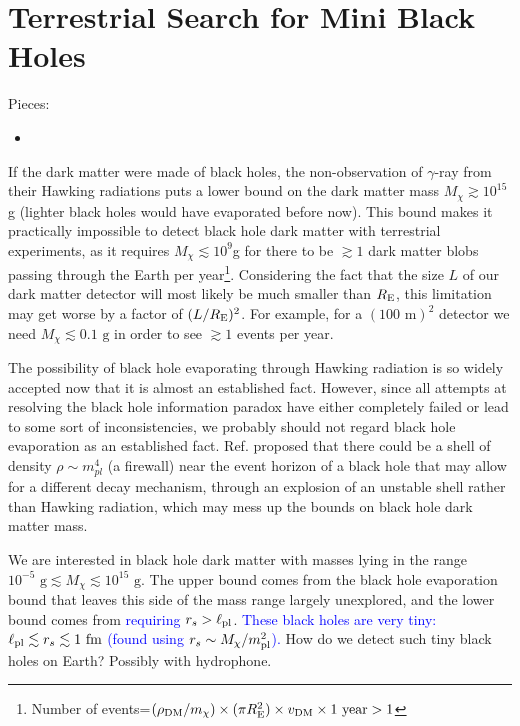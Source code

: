 \documentclass[%
 reprint,
 amsmath,amssymb,
 aps,nofootinbib
]{revtex4-1}
\begin{document}
\section{Terrestrial Search for Mini Black Holes}
Pieces:
\begin{itemize}
\item 
\end{itemize}

If the dark matter were made of black holes, the non-observation of $\gamma$-ray from their Hawking radiations puts a lower bound on the dark matter mass $M_\chi\gtrsim 10^{15}$g (lighter black holes would have evaporated before now). This bound makes it practically impossible to detect black hole dark matter with terrestrial experiments, as it requires $M_\chi\lesssim 10^{9}$g for there to be $\gtrsim 1$ dark matter blobs passing through the Earth per year\footnote{Number of events=$(\rho_{\rm DM}/m_\chi)\times(\pi R_{\rm E}^2)\times v_{\rm DM}\times 1 \text{ year}> 1$}. Considering the fact that the size $L$ of our dark matter detector will most likely be much smaller than $R_{\rm E}$, this limitation may get worse by a factor of $(L/R_{\rm E})^2$. For example, for a $(100\text{ m})^2$ detector we need $M_\chi\lesssim 0.1\text{ g}$ in order to see $\gtrsim 1$ events per year.

The possibility of black hole evaporating through Hawking radiation is so widely accepted now that it is almost an established fact. However, since all attempts at resolving the black hole information paradox have either completely failed or lead to some sort of inconsistencies, we probably should not regard black hole evaporation as an established fact. Ref. \cite{Kaplan:2018dqx} proposed that there could be a shell of density $\rho\sim m_{pl}^4$ (a firewall) near the event horizon of a black hole that may allow for a different decay mechanism, through an explosion of an unstable shell rather than Hawking radiation, which may mess up the bounds on black hole dark matter mass.

We are interested in black hole dark matter with masses lying in the range $10^{-5}\text{ g}\lesssim M_\chi\lesssim 10^{15}\text{ g}$. The upper bound comes from the black hole evaporation bound that leaves this side of the mass range largely unexplored, and the lower bound comes from \textcolor{blue}{requiring $r_s>\ell_{\rm pl}$}. \textcolor{blue}{These black holes are very tiny: $\ell_{\rm pl}\lesssim r_s\lesssim 1\text{ fm}$ (found using $r_s\sim M_\chi/m_{\rm pl}^2$).} How do we detect such tiny black holes on Earth? Possibly with hydrophone.
\end{document}
